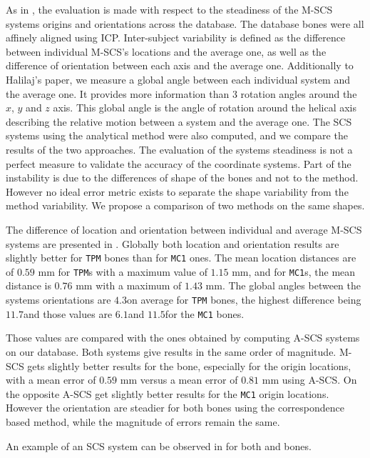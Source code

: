 As in \cite{halilaj_2013_thumb}, the evaluation is made with respect to the steadiness of the M-SCS systems origins and orientations across the database. The database bones were all affinely aligned using ICP. Inter-subject variability is defined as the difference between individual M-SCS's locations and the average one, as well as the difference of orientation between each axis and the average one. Additionally to Halilaj's paper, we measure a global angle between each individual system and the average one. It provides more information than 3 rotation angles around the $x$, $y$ and $z$ axis. This global angle is the angle of rotation around the helical axis describing the relative motion between a system and the average one. The SCS systems using the analytical method were also computed, and we compare the results of the two approaches. The evaluation of the systems steadiness is not a perfect measure to validate the accuracy of the coordinate systems. Part of the instability is due to the differences of shape of the bones and not to the method. However no ideal error metric exists to separate the shape variability from the method variability. We propose a comparison of two methods on the same shapes.


The difference of location and orientation between individual and average M-SCS systems are presented in . Globally both location and orientation results are slightly better for \texttt{TPM} bones than for \texttt{MC1} ones. The mean location distances are of $0.59$ mm for \texttt{TPM}s with a maximum value of $1.15$ mm, and for \texttt{MC1}s, the mean distance is $0.76$ mm with a maximum of $1.43$ mm. The global angles between the systems orientations are $4.3$\degre on average for \texttt{TPM} bones, the highest difference being $11.7$\degre and those values are $6.1$\degre and $11.5$\degre for the \texttt{MC1} bones. 

Those values are compared with the ones obtained by computing A-SCS systems on our database. 
Both systems give results in the same order of magnitude. M-SCS gets slightly better results for the \tpm* bone, especially for the origin locations, with a mean error of $0.59$ mm versus a mean error of $0.81$ mm using A-SCS. On the opposite A-SCS get slightly better results for the \texttt{MC1} origin locations. However the orientation are steadier for both bones using the correspondence based method, while the magnitude of errors remain the same.

An example of an SCS system can be observed in  for both \tpm* and \mcu* bones. 


